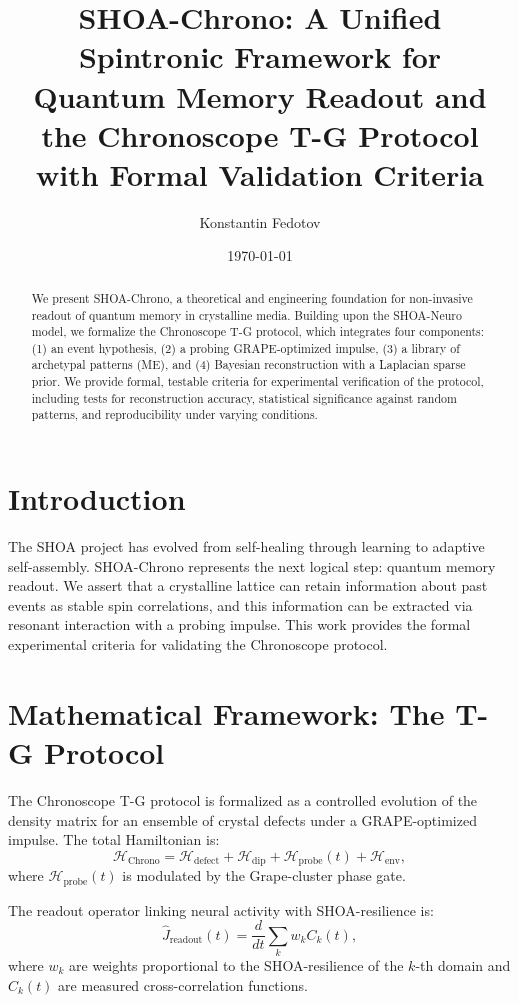\documentclass[12pt]{article}
\title{SHOA-Chrono: A Unified Spintronic Framework for Quantum Memory Readout and the Chronoscope T-G Protocol with Formal Validation Criteria}
\author{Konstantin Fedotov}
\date{\today}
\begin{document}
\maketitle

\begin{abstract}
We present SHOA-Chrono, a theoretical and engineering foundation for non-invasive readout of quantum memory in crystalline media. Building upon the SHOA-Neuro model, we formalize the Chronoscope T-G protocol, which integrates four components: (1) an event hypothesis, (2) a probing GRAPE-optimized impulse, (3) a library of archetypal patterns (ME), and (4) Bayesian reconstruction with a Laplacian sparse prior. We provide formal, testable criteria for experimental verification of the protocol, including tests for reconstruction accuracy, statistical significance against random patterns, and reproducibility under varying conditions.
\end{abstract}

\section{Introduction}
The SHOA project has evolved from self-healing through learning to adaptive self-assembly. SHOA-Chrono represents the next logical step: quantum memory readout. We assert that a crystalline lattice can retain information about past events as stable spin correlations, and this information can be extracted via resonant interaction with a probing impulse. This work provides the formal experimental criteria for validating the Chronoscope protocol.

\section{Mathematical Framework: The T-G Protocol}
The Chronoscope T-G protocol is formalized as a controlled evolution of the density matrix for an ensemble of crystal defects under a GRAPE-optimized impulse. The total Hamiltonian is:
\begin{equation}
\mathcal{H}_{\text{Chrono}} = \mathcal{H}_{\text{defect}} + \mathcal{H}_{\text{dip}} + \mathcal{H}_{\text{probe}}(t) + \mathcal{H}_{\text{env}},
\end{equation}
where $\mathcal{H}_{\text{probe}}(t)$ is modulated by the Grape-cluster phase gate.

The readout operator linking neural activity with SHOA-resilience is:
\begin{equation}
\hat{J}_{\text{readout}}(t) = \frac{d}{dt} \sum_k w_k C_k(t),
\end{equation}
where $w_k$ are weights proportional to the SHOA-resilience of the $k$-th domain and $C_k(t)$ are measured cross-correlation functions.
\end{document}
